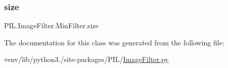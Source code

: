 \subsubsection{\texorpdfstring{size}{size}}
{\footnotesize\ttfamily P\+I\+L.\+Image\+Filter.\+Min\+Filter.\+size}



The documentation for this class was generated from the following file\+:\begin{DoxyCompactItemize}
\item 
venv/lib/python3./site-\/packages/\+P\+I\+L/\hyperlink{ImageFilter_8py}{Image\+Filter.\+py}\end{DoxyCompactItemize}
